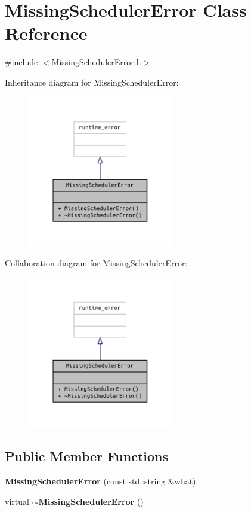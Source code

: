 \section{Missing\+Scheduler\+Error Class Reference}
\label{class_missing_scheduler_error}


{\ttfamily \#include $<$Missing\+Scheduler\+Error.\+h$>$}



Inheritance diagram for Missing\+Scheduler\+Error\+:\nopagebreak
\begin{figure}[H]
\begin{center}
\leavevmode
\includegraphics[width=180pt]{class_missing_scheduler_error__inherit__graph}
\end{center}
\end{figure}


Collaboration diagram for Missing\+Scheduler\+Error\+:\nopagebreak
\begin{figure}[H]
\begin{center}
\leavevmode
\includegraphics[width=180pt]{class_missing_scheduler_error__coll__graph}
\end{center}
\end{figure}
\subsection*{Public Member Functions}
\begin{DoxyCompactItemize}
\item 
{\bf Missing\+Scheduler\+Error} (const std\+::string \&what)
\item 
virtual {\bf $\sim$\+Missing\+Scheduler\+Error} ()
\end{DoxyCompactItemize}


